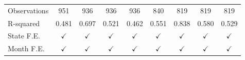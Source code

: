 \begin{tabular}{lcccccccc}
\arrayrulecolor{black!10}\midrule
Observations        &         951         &         936         &         936         &         936         &         840         &         819         &         819         &         819         \\
R-squared           &       0.481         &       0.697         &       0.521         &       0.462         &       0.551         &       0.838         &       0.580         &       0.529         \\
State F.E.          &$\checkmark$         &$\checkmark$         &$\checkmark$         &$\checkmark$         &$\checkmark$         &$\checkmark$         &$\checkmark$         &$\checkmark$         \\
Month F.E.          &$\checkmark$         &$\checkmark$         &$\checkmark$         &$\checkmark$         &$\checkmark$         &$\checkmark$         &$\checkmark$         &$\checkmark$         \\



\end{tabular}
